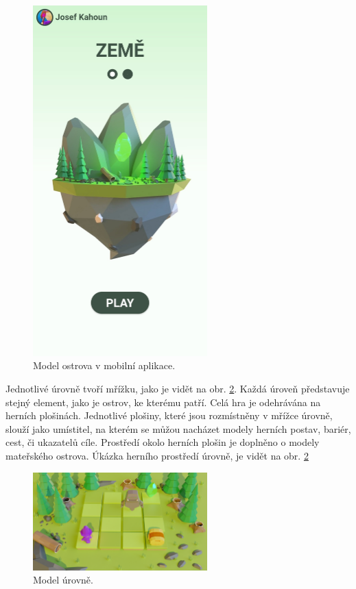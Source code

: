 \begin{figure}[h]
    \centering
    \includegraphics[width=0.6\textwidth]{img/mobilni-aplikace-ostrov.jpg}
    \caption{Model ostrova v mobilní aplikace.}
    \label{fig:mobilni-aplikace-ostrov}
\end{figure}

Jednotlivé úrovně tvoří mřížku, jako je vidět na obr. \ref{fig:model-levelu}. Každá úroveň představuje stejný element, jako je ostrov, ke kterému patří. Celá hra je odehrávána na herních plošinách. Jednotlivé plošiny, které jsou rozmístněny v mřížce úrovně, slouží jako umístitel, na kterém se můžou nacházet modely herních postav, bariér, cest, či ukazatelů cíle. Prostředí okolo herních plošin je doplněno o modely mateřského ostrova. Úkázka herního prostředí úrovně, je vidět na obr. \ref{fig:model-levelu}

\begin{figure}[h]
    \centering
    \includegraphics[width=0.6\textwidth]{img/model-levelu.png}
    \caption{Model úrovně.}
    \label{fig:model-levelu}
\end{figure}